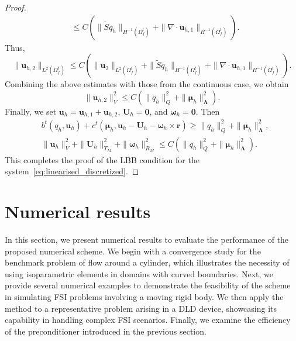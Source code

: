 \documentclass{article}
\newcommand{\bU}{{\mathbf{U}}}
\newcommand{\bu}{{\mathbf{u}}}
\newcommand{\bomega}{{\boldsymbol{\omega}}}
\begin{document}
\begin{proof}
\begin{equation}
\begin{aligned}
        &\leq C(\|\tilde{S}q_h\|_{H^{-1}(\Omega_f^t)} + \|\nabla\cdot\bu_{h,1}\|_{H^{-1}(\Omega_f^t)}).
        \end{aligned}
    \end{equation}
    Thus,
    \begin{equation}
        \|\bu_{h,2}\|_{L^2(\Omega_f^t)}\leq C(\|\bu_2\|_{L^2(\Omega_f^t)} + \|\tilde{S}q_h\|_{H^{-1}(\Omega_f^t)} + \|\nabla\cdot\bu_{h,1}\|_{H^{-1}(\Omega_f^t)}).
    \end{equation}
    Combining the above estimates with those from the continuous case, we obtain
    \begin{equation}
        \|\bu_{h,2}\|_V^2 \leq C (\|{q}_h\|_Q^2 + \|{\boldsymbol{\mu}}_h\|_{\boldsymbol{\Lambda}}^2).
    \end{equation}
    Finally, we set $\bu_h = \bu_{h,1} + \bu_{h,2}$, ${\bU}_h = \mathbf{0}$, and ${\bomega}_h = \mathbf{0}$. Then
    \begin{equation}
        \begin{aligned}
            &{b}^t({q}_h,\bu_h)+{c}^t({\boldsymbol{\mu}}_h,\bu_h - {\bU}_h - {\bomega}_h\times\mathbf{r}) \geq \|{q}_h\|_Q^2 + \|{\boldsymbol{\mu}}_h\|_{\boldsymbol{\Lambda}}^2,\\
            &\|\bu_h\|_V^2 + \|{\bU}_h\|_{T_M}^2 + \|{\bomega}_h\|_{R_M}^2 \leq C(\|{q}_h\|_Q^2 + \|{\boldsymbol{\mu}}_h\|_{\boldsymbol{\Lambda}}^2).
        \end{aligned}
    \end{equation}
    This completes the proof of the LBB condition for the system~\eqref{eq:linearised_discretized}.
\end{proof}


\section{Numerical results}
In this section, we present numerical results to evaluate the performance of the proposed numerical scheme. We begin with a convergence study for the benchmark problem of flow around a cylinder, which illustrates the necessity of using isoparametric elements in domains with curved boundaries. Next, we provide several numerical examples to demonstrate the feasibility of the scheme in simulating FSI problems involving a moving rigid body. We then apply the method to a representative problem arising in a DLD device, showcasing its capability in handling complex FSI scenarios. Finally, we examine the efficiency of the preconditioner introduced in the previous section.
\end{document}
